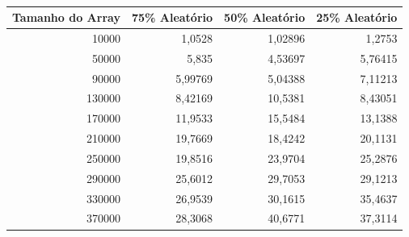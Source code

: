 \documentclass[a4paper, 12pt]{article}
\begin{document}
\begin{longtable}[c]{@{}rrrr@{}}
	\caption{}
	\label{tab:radix2-table}\\
	\toprule
	\multicolumn{1}{l}{\textbf{Tamanho do Array}} & \multicolumn{1}{c}{\textbf{75\% Aleatório}} & \multicolumn{1}{c}{\textbf{50\% Aleatório}} & \multicolumn{1}{c}{\textbf{25\% Aleatório}} \\* \midrule
	\endfirsthead
	\endhead
	\multicolumn{1}{|r|}{10000}                   & \multicolumn{1}{r|}{1,0528}                 & \multicolumn{1}{r|}{1,02896}                & \multicolumn{1}{r|}{1,2753}                 \\* \midrule
	\multicolumn{1}{|r|}{50000}                   & \multicolumn{1}{r|}{5,835}                  & \multicolumn{1}{r|}{4,53697}                & \multicolumn{1}{r|}{5,76415}                \\* \midrule
	\multicolumn{1}{|r|}{90000}                   & \multicolumn{1}{r|}{5,99769}                & \multicolumn{1}{r|}{5,04388}                & \multicolumn{1}{r|}{7,11213}                \\* \midrule
	\multicolumn{1}{|r|}{130000}                  & \multicolumn{1}{r|}{8,42169}                & \multicolumn{1}{r|}{10,5381}                & \multicolumn{1}{r|}{8,43051}                \\* \midrule
	\multicolumn{1}{|r|}{170000}                  & \multicolumn{1}{r|}{11,9533}                & \multicolumn{1}{r|}{15,5484}                & \multicolumn{1}{r|}{13,1388}                \\* \midrule
	\multicolumn{1}{|r|}{210000}                  & \multicolumn{1}{r|}{19,7669}                & \multicolumn{1}{r|}{18,4242}                & \multicolumn{1}{r|}{20,1131}                \\* \midrule
	\multicolumn{1}{|r|}{250000}                  & \multicolumn{1}{r|}{19,8516}                & \multicolumn{1}{r|}{23,9704}                & \multicolumn{1}{r|}{25,2876}                \\* \midrule
	\multicolumn{1}{|r|}{290000}                  & \multicolumn{1}{r|}{25,6012}                & \multicolumn{1}{r|}{29,7053}                & \multicolumn{1}{r|}{29,1213}                \\* \midrule
	\multicolumn{1}{|r|}{330000}                  & \multicolumn{1}{r|}{26,9539}                & \multicolumn{1}{r|}{30,1615}                & \multicolumn{1}{r|}{35,4637}                \\* \midrule
	\multicolumn{1}{|r|}{370000}                  & \multicolumn{1}{r|}{28,3068}                & \multicolumn{1}{r|}{40,6771}                & \multicolumn{1}{r|}{37,3114}                \\* \midrule

\end{longtable}
\end{document}
